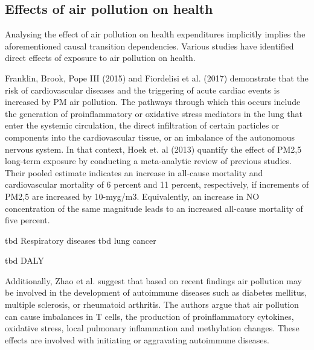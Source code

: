 \documentclass[
]{article}
\begin{document}
\subsection{Effects of air pollution on health}

Analysing the effect of air pollution on health expenditures implicitly implies the aforementioned causal transition dependencies. Various studies have identified direct effects of exposure to air pollution on health. %

Franklin, Brook, Pope III (2015) and Fiordelisi et al. (2017) demonstrate that the risk of cardiovascular diseases and the triggering of acute cardiac events is increased by PM air pollution. The pathways through which this occurs include the generation of proinflammatory or oxidative stress mediators in the lung that enter the systemic circulation, the direct infiltration of certain particles or components into the cardiovascular tissue, or an imbalance of the autonomous nervous system. In that context, Hoek et. al (2013) quantify the effect of PM2,5 long-term exposure by conducting a meta-analytic review of previous studies. Their pooled estimate indicates an increase in all-cause mortality and cardiovascular mortality of 6 percent and 11 percent, respectively, if increments of PM2,5 are increased by 10-myg/m3. Equivalently, an increase in NO concentration of the same magnitude leads to an increased all-cause mortality of five percent. %

tbd Respiratory diseases %
tbd lung cancer %

tbd DALY %

Additionally, Zhao et al. suggest that based on recent findings air pollution may be involved in the development of autoimmune diseases such as diabetes mellitus, multiple sclerosis, or rheumatoid arthritis. The authors argue that air pollution can cause imbalances in T cells, the production of proinflammatory cytokines, oxidative stress, local pulmonary inflammation and methylation changes. These effects are involved with initiating or aggravating autoimmune diseases. %
\end{document}

